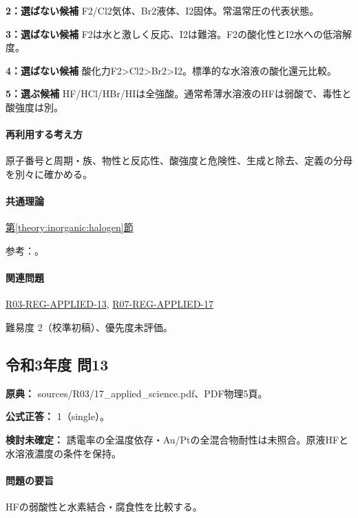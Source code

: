 \noindent\textbf{2：選ばない候補} F2/Cl2気体、Br2液体、I2固体。常温常圧の代表状態。\par

\noindent\textbf{3：選ばない候補} F2は水と激しく反応、I2は難溶。F2の酸化性とI2水への低溶解度。\par

\noindent\textbf{4：選ばない候補} 酸化力F2>Cl2>Br2>I2。標準的な水溶液の酸化還元比較。\par

\noindent\textbf{5：選ぶ候補} HF/HCl/HBr/HIは全強酸。通常希薄水溶液のHFは弱酸で、毒性と酸強度は別。\par

\paragraph{再利用する考え方} 原子番号と周期・族、物性と反応性、酸強度と危険性、生成と除去、定義の分母を別々に確かめる。

\paragraph{共通理論} \hyperref[theory:inorganic:halogen]{第\ref*{theory:inorganic:halogen}節}

\par 参考：\cite{inorganic_halogen_ref,niosh_hf}。

\paragraph{関連問題} \hyperref[q:r03-reg-applied-13]{R03-REG-APPLIED-13}, \hyperref[q:r07-reg-applied-17]{R07-REG-APPLIED-17}

\par 難易度 2（校準初稿）、優先度未評価。

\subsection{令和3年度 問13}
\label{q:r03-reg-applied-13}

\noindent\textbf{原典：} sources/R03/17\_applied\_science.pdf、PDF物理5頁。

\textbf{公式正答：} 1（single）。

\par\textbf{検討未確定：} 誘電率の全温度依存・Au/Ptの全混合物耐性は未照合。原液HFと水溶液濃度の条件を保持。

\paragraph{問題の要旨} HFの弱酸性と水素結合・腐食性を比較する。

